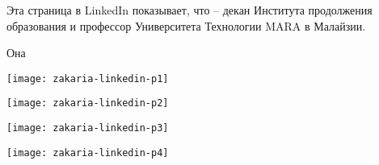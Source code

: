 
Эта страница в LinkedIn показывает, что \DrZakaria -- декан Института продолжения образования и
профессор Университета Технологии MARA в Малайзии.

Она 

\begin{center}
    \texttt{[image: zakaria-linkedin-p1]}
\end{center}
\WillContinue
\pagebreak

\Continuing
\begin{center}
    \texttt{[image: zakaria-linkedin-p2]}
\end{center}
\WillContinue
\pagebreak

\Continuing
\begin{center}
    \texttt{[image: zakaria-linkedin-p3]}
\end{center}
\WillContinue
\pagebreak

\Continuing
\begin{center}
    \texttt{[image: zakaria-linkedin-p4]}
\end{center}

\pagebreak

